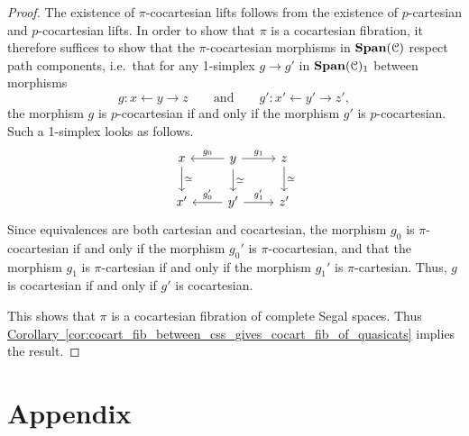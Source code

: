 \documentclass[main.tex]{subfiles}
\begin{document}
\begin{proof}
  The existence of $\pi$-cocartesian lifts follows from the existence of $p$-cartesian and $p$-cocartesian lifts. In order to show that $\pi$ is a cocartesian fibration, it therefore suffices to show that the $\pi$-cocartesian morphisms in $\mathbf{Span}(\mathcal{C})$ respect path components, i.e.\ that for any 1-simplex $g \to g'$ in $\mathbf{Span}(\mathcal{C})_{1}$ between morphisms
  \begin{equation*}
    g\colon x \leftarrow y \to z \qquad\text{and}\qquad g'\colon x' \leftarrow y' \to z',
  \end{equation*}
  the morphism $g$ is $p$-cocartesian if and only if the morphism $g'$ is $p$-cocartesian. Such a 1-simplex looks as follows.
  \begin{equation*}
    \begin{tikzcd}
      x
      \arrow[d, "\simeq"]
      & y
      \arrow[l, swap, "g_{0}"]
      \arrow[r, "g_{1}"]
      \arrow[d, "\simeq"]
      & z
      \arrow[d, "\simeq"]
      \\
      x'
      & y'
      \arrow[l, swap, "g'_{0}"]
      \arrow[r, "g'_{1}"]
      & z'
    \end{tikzcd}
  \end{equation*}
  Since equivalences are both cartesian and cocartesian, the morphism $g_{0}$ is $\pi$-cocartesian if and only if the morphism $g_{0}'$ is $\pi$-cocartesian, and that the morphism $g_{1}$ is $\pi$-cartesian if and only if the morphism $g_{1}'$ is $\pi$-cartesian. Thus, $g$ is cocartesian if and only if $g'$ is cocartesian.

  This shows that $\pi$ is a cocartesian fibration of complete Segal spaces. Thus \hyperref[cor:cocart_fib_between_css_gives_cocart_fib_of_quasicats]{Corollary~\ref*{cor:cocart_fib_between_css_gives_cocart_fib_of_quasicats}} implies the result.
\end{proof}

\appendix

\section{Appendix}
\end{document}
